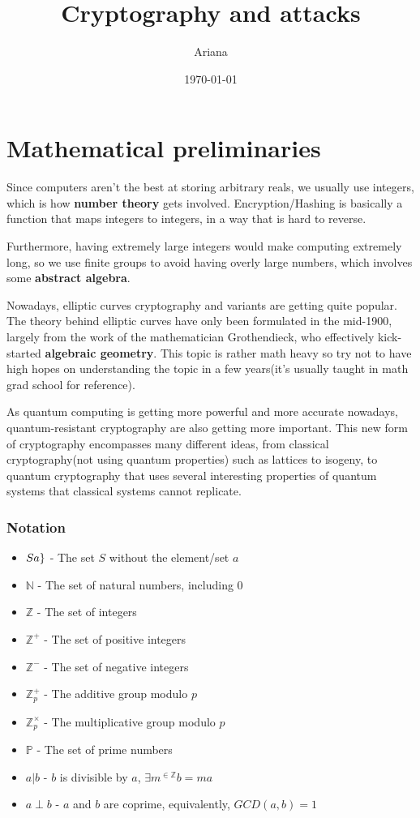 \documentclass{report}
\title{Cryptography and attacks}
\author{Ariana}
\date{\today}
\begin{document}
\maketitle
\tableofcontents{}
\part{Mathematical preliminaries}
Since computers aren't the best at storing arbitrary reals, we usually use integers, which is how \textbf{number theory} gets involved. Encryption/Hashing is basically a function that maps integers to integers, in a way that is hard to reverse.

Furthermore, having extremely large integers would make computing extremely long, so we use finite groups to avoid having overly large numbers, which involves some \textbf{abstract algebra}.

Nowadays, elliptic curves cryptography and variants are getting quite popular. The theory behind elliptic curves have only been formulated in the mid-1900, largely from the work of the mathematician Grothendieck, who effectively kick-started \textbf{algebraic geometry}. This topic is rather math heavy so try not to have high hopes on understanding the topic in a few years(it's usually taught in math grad school for reference). 

As quantum computing is getting more powerful and more accurate nowadays, quantum-resistant cryptography are also getting more important. This new form of cryptography encompasses many different ideas, from classical cryptography(not using quantum properties) such as lattices to isogeny, to quantum cryptography that uses several interesting properties of quantum systems that classical systems cannot replicate.

\section{Notation}
\begin{itemize}
	\item[]$S\\{a}\}$ - The set $S$ without the element/set $a$
	\item[]$\mathbb{N}$ - The set of natural numbers, including $0$
	\item[]$\mathbb{Z}$ - The set of integers
	\item[]$\mathbb{Z}^+$ - The set of positive integers
	\item[]$\mathbb{Z}^-$ - The set of negative integers
	\item[]$\mathbb{Z}_p^+$ - The additive group modulo $p$
	\item[]$\mathbb{Z}_p^\times$ - The multiplicative group modulo $p$
	\item[]$\mathbb{P}$ - The set of prime numbers
	\item[]$a|b$ - $b$ is divisible by $a$, $\exists m^{\in\mathbb{Z}}b=ma$
	\item[]$a\perp b$ - $a$ and $b$ are coprime, equivalently, $GCD(a,b)=1$
\end{itemize}
\end{document}
